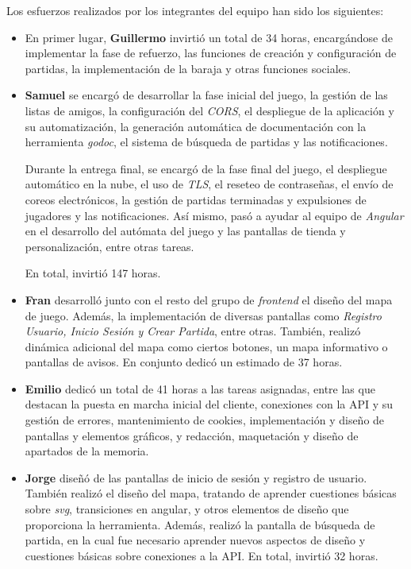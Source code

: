 \documentclass[11pt, a4paper, titlepage]{article}
\begin{document}
Los esfuerzos realizados por los integrantes del equipo han sido los siguientes:

\begin{itemize}
    \item En primer lugar, \textbf{Guillermo} invirtió un total de 34 horas, encargándose de implementar la fase de refuerzo, las funciones de creación y configuración de partidas, la implementación de la baraja y otras funciones sociales.

    \item \textbf{Samuel} se encargó de desarrollar la fase inicial del juego, la gestión de las listas de amigos, la configuración del \textit{CORS}, el despliegue de la aplicación y su automatización, la generación automática de documentación con la herramienta \textit{godoc}, el sistema de búsqueda de partidas y las notificaciones.
    
    Durante la entrega final, se encargó de la fase final del juego, el despliegue automático en la nube, el uso de \textit{TLS}, el reseteo de contraseñas, el envío de coreos electrónicos, la gestión de partidas terminadas y expulsiones de jugadores y las notificaciones. Así mismo, pasó a ayudar al equipo de \textit{Angular} en el desarrollo del autómata del juego y las pantallas de tienda y personalización, entre otras tareas.
    
    En total, invirtió 147 horas.

    \item \textbf{Fran} desarrolló junto con el resto del grupo de \textit{frontend} el diseño del mapa de juego. Además, la implementación de diversas pantallas como \textit{Registro Usuario, Inicio Sesión y Crear Partida}, entre otras. También, realizó dinámica adicional del mapa como ciertos botones, un mapa informativo o pantallas de avisos. En conjunto dedicó un estimado de 37 horas.

    \item \textbf{Emilio} dedicó un total de 41 horas a las tareas asignadas, entre las que destacan la puesta en marcha inicial del cliente, conexiones con la API y su gestión de errores, mantenimiento de cookies, implementación y diseño de pantallas y elementos gráficos, y redacción, maquetación y diseño de apartados de la memoria.

    \item \textbf{Jorge} diseñó de las pantallas de inicio de sesión y registro de usuario. También realizó el diseño del mapa, tratando de aprender cuestiones básicas sobre \textit{svg}, transiciones en angular, y otros elementos de diseño que proporciona la herramienta. Además, realizó la pantalla de búsqueda de partida, en la cual fue necesario aprender nuevos aspectos de diseño y cuestiones básicas sobre conexiones a la API. En total, invirtió 32 horas.


\end{itemize}
\end{document}
